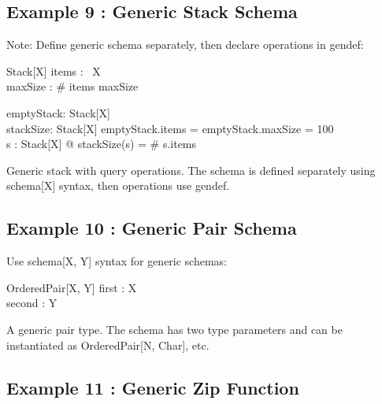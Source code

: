 \documentclass[a4paper,10pt,fleqn]{article}
\begin{document}
\bigskip

\subsection*{Example 9 : Generic Stack Schema}

\noindent Note: Define generic schema separately, then declare operations in gendef:

\bigskip

\begin{schema}{Stack}[X]
items : \seq~X \\
maxSize : \nat
\where
\# items \leq maxSize
\end{schema}

\begin{gendef}[X]
  emptyStack: Stack[X] \\
  stackSize: Stack[X] \fun \nat
\where
  emptyStack.items = \langle \rangle \land emptyStack.maxSize = 100 \\
  \forall s : Stack[X] @ stackSize(s) = \# s.items
\end{gendef}

\noindent Generic stack with query operations. The schema is defined separately using schema[X] syntax, then operations use gendef.

\bigskip

\subsection*{Example 10 : Generic Pair Schema}

\noindent Use schema[X, Y] syntax for generic schemas:

\bigskip

\begin{schema}{OrderedPair}[X, Y]
first : X \\
second : Y
\end{schema}

\noindent A generic pair type. The schema has two type parameters and can be instantiated as OrderedPair[N, Char], etc.

\bigskip

\subsection*{Example 11 : Generic Zip Function}
\end{document}
